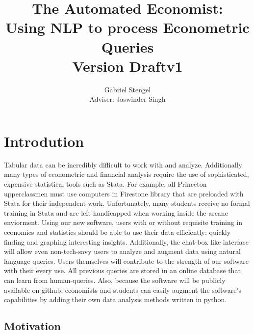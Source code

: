 \documentclass[pageno]{jpaper}
\begin{document}
\title{
The Automated Economist:\\ Using NLP to process Econometric Queries\\
Version Draftv1}

\author{Gabriel Stengel \\Adviser: Jaswinder Singh}

\date{}
\maketitle

\thispagestyle{empty}
\doublespacing

\section{Introdution }

Tabular data can be incredibly difficult to work with and analyze. Additionally many types of econometric and financial analysis require the use of sophisticated, expensive statistical tools such as Stata. For example, all Princeton upperclassmen must use computers in Firestone library that are preloaded with Stata for their independent work. Unfortunately, many students receive no formal training in Stata and are left handicapped when working inside the arcane enviorment. Using our new software,  users with or without requisite training in economics and statistics should be able to use their data efficiently: quickly finding and graphing interesting insights. Additionally, the chat-box like interface will allow even non-tech-savy users to analyze and augment data using natural language queries. Users themselves will contribute to the strength of our software with their every use. All previous queries are stored in an online database that can learn from human-queries. Also, because the software will be publicly available on github, economists and students can easily augment the software's capabilities by adding their own data analysis methods written in python. 

\subsection{Motivation}
\end{document}
